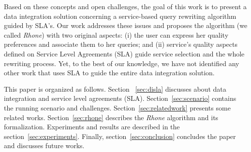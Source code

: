 Based on these concepts and open challenges, the goal of this work is to present
a data integration solution concerning a service-based query rewriting algorithm guided by SLA's.
Our work addresses these issues and proposes the algorithm (we
called \textit{Rhone}) with two original aspects: (i) the user can express her
quality preferences and associate them to her queries; and (ii)  service's quality aspects defined on Service Level Agreements (SLA) guide service selection and the whole rewriting process.
Yet, to the best of our knowledge, we have not identified any other work that uses SLA to guide the entire data integration solution.

This paper is organized as follows. Section ~\ref{sec:disla} discusses
about data integration and service level agreements (SLA).
Section~\ref{sec:scenario} contains the running scenario and challenges.
Section~\ref{sec:relatedwork} presents some related works.
Section~\ref{sec:rhone} describes the \textit{Rhone} algorithm and its
formalization.
Experiments and results are described in the section~\ref{sec:experiments}. 
Finally, section~\ref{sec:conclusion} concludes the paper and discusses future works.
